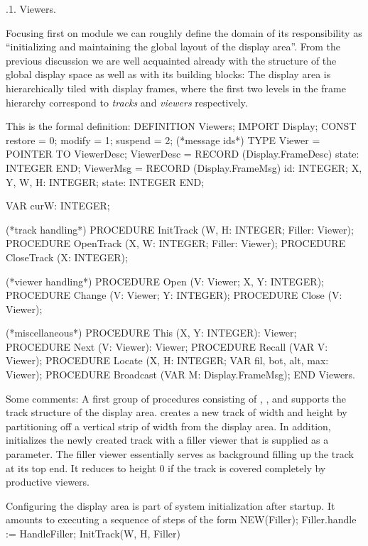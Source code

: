 .1. Viewers.


Focusing first on module  we can roughly define the domain of
its responsibility as ``initializing and maintaining the global layout
of the display area''. From the previous discussion we are well
acquainted already with the structure of the global display space as
well as with its building blocks: The display area is hierarchically
tiled with display frames, where the first two levels in the frame
hierarchy correspond to \emph{tracks} and \emph{viewers} respectively.

This is the formal definition:
\begintt
DEFINITION Viewers;
  IMPORT Display;
  CONST restore = 0; modify = 1; suspend = 2; (*message ids*)
  TYPE Viewer = POINTER TO ViewerDesc;
       ViewerDesc = RECORD (Display.FrameDesc)
         state: INTEGER
       END;
       ViewerMsg = RECORD (Display.FrameMsg)
         id: INTEGER;
         X, Y, W, H: INTEGER;
         state: INTEGER
       END;

  VAR curW: INTEGER;
       
  (*track handling*)
  PROCEDURE InitTrack (W, H: INTEGER; Filler: Viewer);
  PROCEDURE OpenTrack (X, W: INTEGER; Filler: Viewer);
  PROCEDURE CloseTrack (X: INTEGER);

  (*viewer handling*)
  PROCEDURE Open (V: Viewer; X, Y: INTEGER);
  PROCEDURE Change (V: Viewer; Y: INTEGER);
  PROCEDURE Close (V: Viewer);

  (*miscellaneous*)
  PROCEDURE This (X, Y: INTEGER): Viewer;
  PROCEDURE Next (V: Viewer): Viewer;
  PROCEDURE Recall (VAR V: Viewer);
  PROCEDURE Locate (X, H: INTEGER; VAR fil, bot, alt, max: Viewer);
  PROCEDURE Broadcast (VAR M: Display.FrameMsg);
END Viewers.
\endtt

\noindent Some comments: A first group of procedures consisting of , , and  supports the
track structure of the display area.  creates a new track of
width  and height  by partitioning off a vertical strip of width 
from the display area. In addition,  initializes the newly
created track with a filler viewer that is supplied as a
parameter. The filler viewer essentially serves as background filling
up the track at its top end. It reduces to height 0 if the track is
covered completely by productive viewers.

Configuring the display area is part of system initialization after
startup. It amounts to executing a sequence of steps of the form
\begintt
NEW(Filler); Filler.handle := HandleFiller; InitTrack(W, H, Filler)
\endtt

